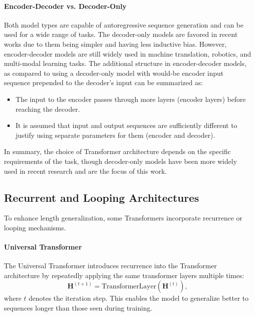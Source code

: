 \paragraph{Encoder-Decoder vs. Decoder-Only} Both model types are capable of autoregressive sequence generation and can be used for a wide range of tasks. The decoder-only models are favored in recent works due to them being simpler and having less inductive bias. However, encoder-decoder models are still widely used in machine translation, robotics, and multi-modal learning tasks. The additional structure in encoder-decoder models, as compared to using a decoder-only model with would-be encoder input sequence prepended to the decoder's input can be summarized as:
\begin{itemize}
    \item The input to the encoder passes through more layers (encoder layers) before reaching the decoder.
    \item It is assumed that input and output sequences are sufficiently different to justify using separate parameters for them (encoder and decoder).
\end{itemize}

In summary, the choice of Transformer architecture depends on the specific requirements of the task, though decoder-only models have been more widely used in recent research and are the focus of this work.

\subsection{Recurrent and Looping Architectures}\label{subsec:recurrent_looping}

To enhance length generalization, some Transformers incorporate recurrence or looping mechanisms.

\paragraph{Universal Transformer}

The Universal Transformer \cite{dehghani_universal_2018} introduces recurrence into the Transformer architecture by repeatedly applying the same transformer layers multiple times:
\begin{equation*}
    \mathbf{H}^{(t+1)} = \text{TransformerLayer}(\mathbf{H}^{(t)}),
\end{equation*}
where $t$ denotes the iteration step. This enables the model to generalize better to sequences longer than those seen during training.

